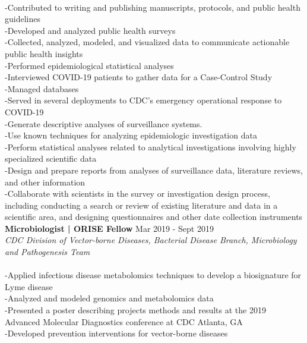 \documentclass[11pt]{article}
\begin{document}
{{        \\-Contributed to writing and publishing manuscripts, protocols, and public health guidelines
        \\-Developed and analyzed public health surveys
        \\-Collected, analyzed, modeled, and visualized data to communicate actionable public health insights
        \\-Performed epidemiological statistical analyses
        \\-Interviewed COVID-19 patients to gather data for a Case-Control Study
        \\-Managed databases
        \\-Served in several deployments to CDC's emergency operational response to COVID-19
        \\-Generate descriptive analyses of surveillance systems.
        \\-Use known techniques for analyzing epidemiologic investigation data
        \\-Perform statistical analyses related to analytical investigations involving highly specialized scientific data
        \\-Design and prepare reports from analyses of surveillance data, literature reviews, and other information
        \\-Collaborate with scientists in the survey or investigation design process, including conducting a search or review of existing literature and data in a scientific area, and designing questionnaires and other date collection instruments\\
        } \vspace{10pt}   
		\textsf{\textbf{Microbiologist | ORISE Fellow }\hspace{250pt}Mar 2019 - Sept 2019 \\ \textit{CDC Division of Vector-borne Diseases, Bacterial Disease Branch, Microbiology and Pathogenesis Team}\\ 
		\\-Applied infectious disease metabolomics techniques to develop a biosignature for Lyme disease 
		\\-Analyzed and modeled genomics and metabolomics data
        \\-Presented a poster describing projects methods and results at the 2019 Advanced Molecular Diagnostics conference at CDC Atlanta, GA
        \\-Developed prevention interventions for vector-borne diseases 
}}
\end{document}
